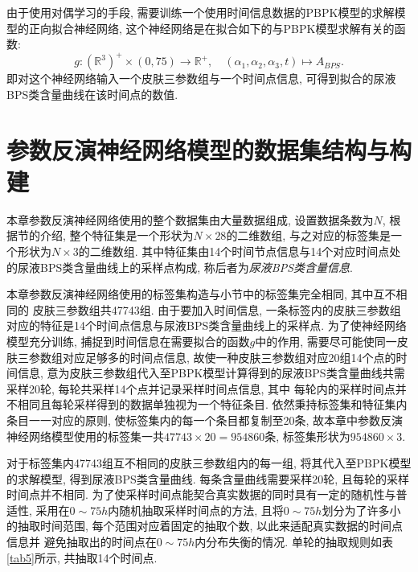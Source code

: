 \documentclass[a4paper,punct=banjiao,twoside]{ctexrep}
\theoremstyle{plain}
\theoremstyle{definition}
\theoremstyle{remark}
\begin{document}
由于使用对偶学习的手段, 需要训练一个使用时间信息数据的PBPK模型的求解模型的正向拟合神经网络, 这个神经网络是在拟合如下的与PBPK模型求解有关的函数:
\begin{equation}
\label{eq3.1}
g:(\mathbb{R}^3)^{+}\times (0,75) \to \mathbb{R}^{+},\quad (\alpha_1,\alpha_2,\alpha_3, t)\mapsto A_{BPS}.
\end{equation}
即对这个神经网络输入一个皮肤三参数组与一个时间点信息, 可得到拟合的尿液BPS类含量曲线在该时间点的数值. 


\section{参数反演神经网络模型的数据集结构与构建}
\label{4.2}
本章参数反演神经网络使用的整个数据集由大量数据组成, 设置数据条数为$N$, 根据\label{4.1}节的介绍, 整个特征集是一个形状为$N \times 28$的二维数组,  与之对应的标签集是一个形状为$N \times 3$的二维数组. 
其中特征集由14个时间节点信息与14个对应时间点处的尿液BPS类含量曲线上的采样点构成, 称后者为\textit{尿液BPS类含量信息}. 

本章参数反演神经网络使用的标签集构造与\label{3.2.1}小节中的标签集完全相同, 其中互不相同的
皮肤三参数组共47743组. 
由于要加入时间信息, 一条标签内的皮肤三参数组对应的特征是14个时间点信息与尿液BPS类含量曲线上的采样点.  为了使神经网络模型充分训练, 捕捉到时间信息在需要拟合的函数$g$中的作用, 
需要尽可能使同一皮肤三参数组对应足够多的时间点信息, 故使一种皮肤三参数组对应20组14个点的时间信息, 意为皮肤三参数组代入至PBPK模型计算得到的尿液BPS类含量曲线共需采样20轮, 每轮共采样14个点并记录采样时间点信息, 其中
每轮内的采样时间点并不相同且每轮采样得到的数据单独视为一个特征条目. 依然秉持标签集和特征集内条目一一对应的原则, 使标签集内的每一个条目都复制至20条, 故本章中参数反演神经网络模型使用的标签集一共$47743\times 20 = 954860$条, 
标签集形状为$954860\times 3$.

对于标签集内47743组互不相同的皮肤三参数组内的每一组, 将其代入至PBPK模型的求解模型, 得到尿液BPS类含量曲线. 每条含量曲线需要采样20轮, 且每轮的采样时间点并不相同.
为了使采样时间点能契合真实数据的同时具有一定的随机性与普适性, 采用在$0\sim 75h$内随机抽取采样时间点的方法, 且将$0\sim 75h$划分为了许多小的抽取时间范围, 每个范围对应着固定的抽取个数, 以此来适配真实数据的时间点信息并
避免抽取出的时间点在$0\sim 75h$内分布失衡的情况. 单轮的抽取规则如表\ref{tab5}所示, 共抽取14个时间点.
\end{document}
